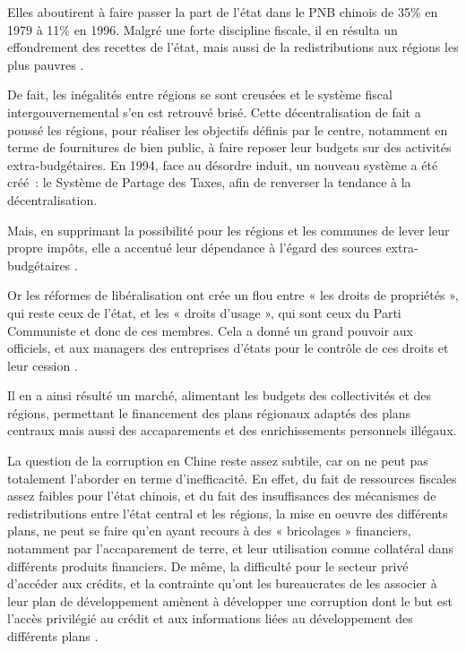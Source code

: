\documentclass[a4paper]{article}
\begin{document}
Elles aboutirent à faire passer la part de l’état dans le PNB chinois de 35\% en 1979 à 11\% en 1996. Malgré une forte discipline fiscale, il en résulta un effondrement des recettes de l’état, mais aussi de la redistributions aux régions les plus pauvres \cite{wong09_rebuil_gover_centur}.

De fait, les inégalités entre régions se sont creusées et le système fiscal intergouvernemental s’en est retrouvé brisé. Cette décentralisation de fait a poussé les régions, pour réaliser les objectifs définis par le centre, notamment en terme de fournitures de bien public, à faire reposer leur budgets sur des activités extra-budgétaires. En 1994, face au désordre induit, un nouveau système a été créé~: le Système de Partage des Taxes, afin de renverser la tendance à la décentralisation.

Mais, en supprimant la possibilité pour les régions et les communes de lever leur propre impôts, elle a accentué leur dépendance à l’égard des sources extra-budgétaires \cite{wong09_rebuil_gover_centur}.

Or les réformes de libéralisation ont crée un flou entre « les droits de propriétés », qui reste ceux de l’état, et les « droits d’usage », qui sont ceux du Parti Communiste et donc de ces membres. Cela a donné un grand pouvoir aux officiels, et aux managers des entreprises d’états pour le contrôle de ces droits et leur cession \cite{pei16_chinas}.

Il en a ainsi résulté un marché, alimentant les budgets des collectivités et des régions, permettant le financement des plans régionaux adaptés des plans centraux mais aussi des accaparements et des enrichissements personnels illégaux.

La question de la corruption en Chine reste assez subtile, car on ne peut pas totalement l’aborder en terme d’inefficacité. En effet, du fait de ressources fiscales assez faibles pour l’état chinois, et du fait des insuffisances des mécanismes de redistributions entre l’état central et les régions, la mise en oeuvre des différents plans, ne peut se faire qu’en ayant recours à des « bricolages » financiers, notamment par l’accaparement de terre, et leur utilisation comme collatéral dans différents produits financiers. De même, la difficulté pour le secteur privé d’accéder aux crédits, et la contrainte qu’ont les bureaucrates de les associer à leur plan de développement amènent à développer une corruption dont le but est l’accès privilégié au crédit et aux informations liées au développement des différents plans \cite{ang20_chinas}. 
\end{document}
